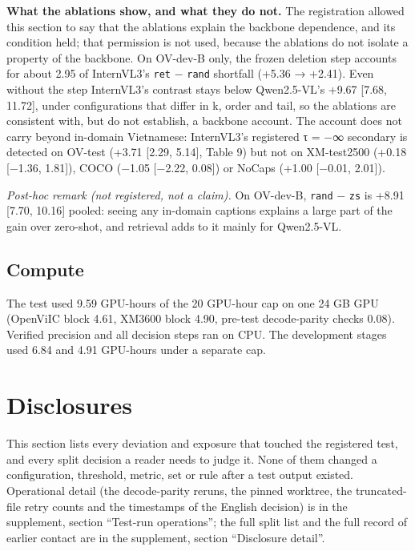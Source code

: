 \documentclass[manuscript,screen]{acmart}
\begin{document}
\textbf{What the ablations show, and what they do not.} The registration allowed this section to say
that the ablations explain the backbone dependence, and its condition held; that permission is not
used, because the ablations do not isolate a property of the backbone. On OV-dev-B only, the frozen
deletion step accounts for about 2.95 of InternVL3's \texttt{ret} − \texttt{rand} shortfall (+5.36 →
+2.41). Even without the step InternVL3's contrast stays below Qwen2.5-VL's +9.67 {[}7.68, 11.72{]},
under configurations that differ in k, order and tail, so the ablations are consistent with, but do
not establish, a backbone account. The account does not carry beyond in-domain Vietnamese:
InternVL3's registered τ = −∞ secondary is detected on OV-test (+3.71 {[}2.29, 5.14{]}, Table 9) but
not on XM-test2500 (+0.18 {[}−1.36, 1.81{]}), COCO (−1.05 {[}−2.22, 0.08{]}) or NoCaps (+1.00
{[}−0.01, 2.01{]}).

\emph{Post-hoc remark (not registered, not a claim).} On OV-dev-B, \texttt{rand} − \texttt{zs} is
+8.91 {[}7.70, 10.16{]} pooled: seeing any in-domain captions explains a large part of the gain over
zero-shot, and retrieval adds to it mainly for Qwen2.5-VL.

\subsection{Compute}\label{compute}

The test used 9.59 GPU-hours of the 20 GPU-hour cap on one 24 GB GPU (OpenViIC block 4.61, XM3600
block 4.90, pre-test decode-parity checks 0.08). Verified precision and all decision steps ran on
CPU. The development stages used 6.84 and 4.91 GPU-hours under a separate cap.

\section{Disclosures}\label{disclosures}

This section lists every deviation and exposure that touched the registered test, and every split
decision a reader needs to judge it. None of them changed a configuration, threshold, metric, set or
rule after a test output existed. Operational detail (the decode-parity reruns, the pinned worktree,
the truncated-file retry counts and the timestamps of the English decision) is in the supplement,
section ``Test-run operations''; the full split list and the full record of earlier contact are in
the supplement, section ``Disclosure detail''.
\end{document}
